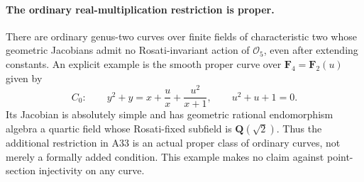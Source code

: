 \paragraph{The ordinary real-multiplication restriction is proper.}
There are ordinary genus-two curves over finite fields of characteristic
two whose geometric Jacobians admit no Rosati-invariant action of
$\mathcal O_5$, even after extending constants. An explicit example is
the smooth proper curve over $\mathbf F_4=\mathbf F_2(u)$ given by
\[
 C_0:\qquad y^2+y=x+\frac{u}{x}+\frac{u^2}{x+1},
                         \qquad u^2+u+1=0.
 \tag{DRP.1}
\]
Its Jacobian is absolutely simple and has geometric rational
endomorphism algebra a quartic field whose Rosati-fixed subfield is
$\mathbf Q(\sqrt2)$. Thus the additional restriction in A33 is an
actual proper class of ordinary curves, not merely a formally added
condition. This example makes no claim against point-section
injectivity on any curve.

